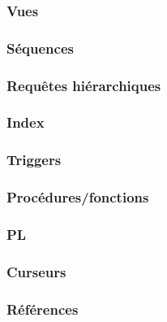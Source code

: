 \documentclass[12pt,a4paper]{article}
\begin{document}
\subsubsection{Vues}


\subsubsection{Séquences}

\subsubsection{Requêtes hiérarchiques}


\subsubsection{Index}

\subsubsection{Triggers}

\subsubsection{Procédures/fonctions}

\subsubsection{PL}

\subsubsection{Curseurs}

\subsubsection{Références}


	
	
	
	
\end{document}
